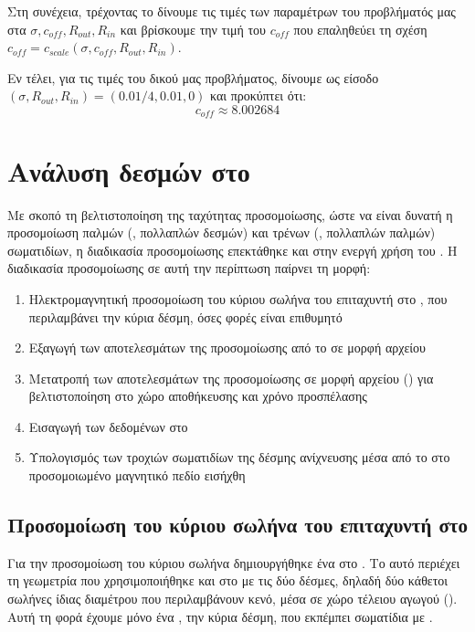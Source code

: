 Στη συνέχεια, τρέχοντας το   δίνουμε τις τιμές των παραμέτρων του προβλήματός μας στα $\sigma, c_{off}, R_{out}, R_{in}$ και βρίσκουμε την τιμή του $c_{off}$ που επαληθεύει τη σχέση $c_{off} = c_{scale} \left(\sigma, c_{off}, R_{out}, R_{in} \right)$.





Εν τέλει, για τις τιμές του δικού μας προβλήματος, δίνουμε ως είσοδο $\left(\sigma, R_{out}, R_{in} \right) = \left(0.01/4,0.01, 0 \right)$ και προκύπτει ότι:
\begin{equation}
c_{off} \approx 8.002684
\end{equation}

\section{Ανάλυση δεσμών στο }

Με σκοπό τη βελτιστοποίηση της ταχύτητας προσομοίωσης, ώστε να είναι δυνατή η προσομοίωση παλμών (, πολλαπλών δεσμών) και τρένων (, πολλαπλών παλμών) σωματιδίων, η διαδικασία προσομοίωσης επεκτάθηκε και στην ενεργή χρήση του .
Η διαδικασία προσομοίωσης σε αυτή την περίπτωση παίρνει τη μορφή:
\begin{enumerate}
\item Ηλεκτρομαγνητική προσομοίωση του κύριου σωλήνα του επιταχυντή στο , που περιλαμβάνει την κύρια δέσμη, όσες φορές είναι επιθυμητό
\item Εξαγωγή των αποτελεσμάτων της προσομοίωσης από το  σε μορφή αρχείου 
\item Μετατροπή των αποτελεσμάτων της προσομοίωσης σε μορφή αρχείου  () για βελτιστοποίηση στο χώρο αποθήκευσης και χρόνο προσπέλασης
\item Εισαγωγή των δεδομένων στο 
\item Υπολογισμός των τροχιών σωματιδίων της δέσμης ανίχνευσης μέσα από το  στο προσομοιωμένο μαγνητικό πεδίο εισήχθη
\end{enumerate}

\subsection{Προσομοίωση του κύριου σωλήνα του επιταχυντή στο }
Για την προσομοίωση του κύριου σωλήνα δημιουργήθηκε ένα  στο .
Το  αυτό περιέχει τη γεωμετρία που χρησιμοποιήθηκε και στο  με τις δύο δέσμες, δηλαδή δύο κάθετοι σωλήνες ίδιας διαμέτρου που περιλαμβάνουν κενό, μέσα σε χώρο τέλειου αγωγού ().
Αυτή τη φορά έχουμε μόνο ένα , την κύρια δέσμη, που εκπέμπει σωματίδια με .

